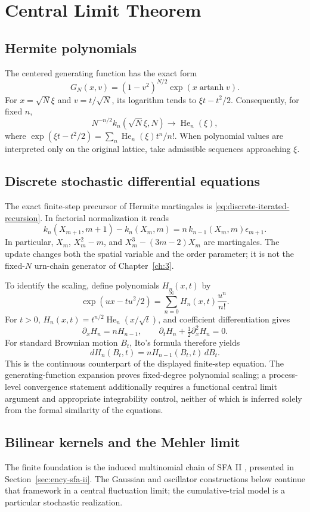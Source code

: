 \chapter{Central Limit Theorem}
\label{ch:11}
\section{Hermite polynomials}
\label{sec:11-1}
The centered generating function has the exact form
\[
G_N(x,v)=(1-v^2)^{N/2}\exp(x\operatorname{artanh}v).
\]
For $x=\sqrt N\xi$ and $v=t/\sqrt N$, its logarithm tends to $\xi t-t^2/2$. Consequently, for fixed $n$,
\[
N^{-n/2}k_n(\sqrt N\xi,N)\longrightarrow\operatorname{He}_n(\xi),
\]
where $\exp(\xi t-t^2/2)=\sum_n\operatorname{He}_n(\xi)t^n/n!$. When polynomial values are interpreted only on the original lattice, take admissible sequences approaching $\xi$.

\section{Discrete stochastic differential equations}
\label{sec:11-2}
The exact finite-step precursor of Hermite martingales is \eqref{eq:discrete-iterated-recursion}. In factorial normalization it reads
\[
k_n(X_{m+1},m+1)-k_n(X_m,m)
=n\,k_{n-1}(X_m,m)\epsilon_{m+1}.
\]
In particular, $X_m$, $X_m^2-m$, and $X_m^3-(3m-2)X_m$ are martingales. The update changes both the spatial variable and the order parameter; it is not the fixed-$N$ urn-chain generator of Chapter~\ref{ch:3}.

To identify the scaling, define polynomials $H_n(x,t)$ by
\[
\exp(ux-tu^2/2)=\sum_{n=0}^{\infty}H_n(x,t)\frac{u^n}{n!}.
\]
For $t>0$, $H_n(x,t)=t^{n/2}\operatorname{He}_n(x/\sqrt t)$, and coefficient differentiation gives
\[
\partial_xH_n=nH_{n-1},\qquad
\partial_tH_n+\tfrac12\partial_x^2H_n=0.
\]
For standard Brownian motion $B_t$, Ito's formula therefore yields
\[
dH_n(B_t,t)=nH_{n-1}(B_t,t)\,dB_t.
\]
This is the continuous counterpart of the displayed finite-step equation. The generating-function expansion proves fixed-degree polynomial scaling; a process-level convergence statement additionally requires a functional central limit argument and appropriate integrability control, neither of which is inferred solely from the formal similarity of the equations.

\section{Bilinear kernels and the Mehler limit}
\label{sec:11-3}
The finite foundation is the induced multinomial chain of SFA II
\cite{FeinsilverSFAII2023}, presented in
Section~\ref{sec:ency-sfa-ii}. The Gaussian and oscillator constructions
below continue that framework in a central fluctuation limit; the
cumulative-trial model is a particular stochastic realization.

